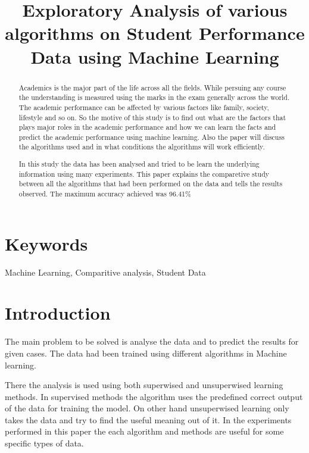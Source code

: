 \documentclass[conference,compsoc]{IEEEtran}
\begin{document}
\title{Exploratory Analysis of various algorithms on Student Performance Data using Machine Learning}
\author{
}
\maketitle

\begin{abstract}
	Academics is the major part of the life across all the fields. While persuing any course the understanding is measured using the marks in the exam generally across the world. The academic performance can be affected by various factors like family, society, lifestyle and so on. So the motive of this study is to find out what are the factors that plays major roles in the academic performance and how we can learn the facts and predict the academic performance using machine learning. Also the paper will discuss the algorithms used and in what conditions the algorithms will work efficiently.
	

	In this study the data has been analysed and tried to be learn the underlying information using many experiments. This paper explains the comparetive study between all the algorithms that had been performed on the data and tells the results observed. The maximum accuracy achieved was 96.41\%
\end{abstract}
\section{Keywords}
	Machine Learning, Comparitive analysis, Student Data 



\section{Introduction}
The main problem to be solved is analyse the data and to predict the results for given cases. The data had been trained using different algorithms in Machine learning. 

There the analysis is used using both superwised and unsuperwised learning methods.
In supervised methods the algorithm uses the predefined correct output of the data for training the model. On other hand unsuperwised learning only takes the data and try to find the useful meaning out of it. In the experiments performed in this paper the each algorithm and methods are useful for some specific types of data. 
\end{document}
